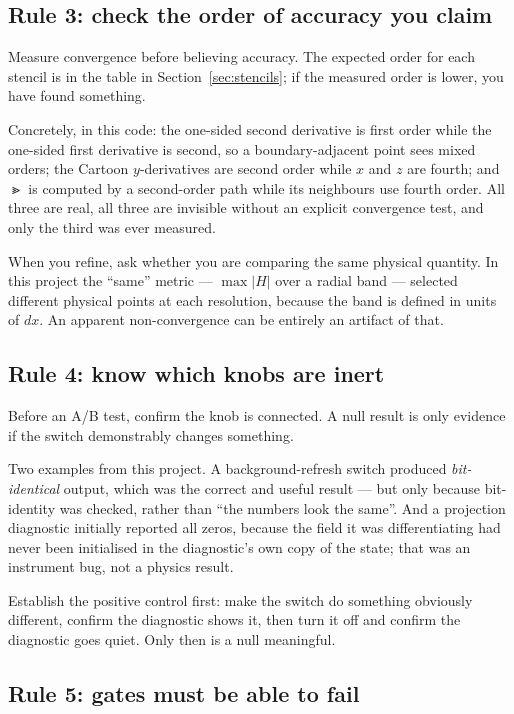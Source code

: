 \subsection{Rule 3: check the order of accuracy you claim}

Measure convergence before believing accuracy. The expected order for each
stencil is in the table in Section~\ref{sec:stencils}; if the measured order is
lower, you have found something.

Concretely, in this code: the one-sided second derivative is first order while
the one-sided first derivative is second, so a boundary-adjacent point sees
mixed orders; the Cartoon $y$-derivatives are second order while $x$ and $z$
are fourth; and $\Gt$ is computed by a second-order path while its
neighbours use fourth order. All three are real, all three are invisible
without an explicit convergence test, and only the third was ever measured.

\gotcha
When you refine, ask whether you are comparing the same physical quantity. In
this project the ``same'' metric --- $\max|H|$ over a radial band --- selected
different physical points at each resolution, because the band is defined in
units of $dx$. An apparent non-convergence can be entirely an artifact of that.

\subsection{Rule 4: know which knobs are inert}

Before an A/B test, confirm the knob is connected. A null result is only
evidence if the switch demonstrably changes something.

Two examples from this project. A background-refresh switch produced
\emph{bit-identical} output, which was the correct and useful result --- but
only because bit-identity was checked, rather than ``the numbers look the
same''. And a projection diagnostic initially reported all zeros, because the
field it was differentiating had never been initialised in the diagnostic's
own copy of the state; that was an instrument bug, not a physics result.

\gotcha
Establish the positive control first: make the switch do something obviously
different, confirm the diagnostic shows it, then turn it off and confirm the
diagnostic goes quiet. Only then is a null meaningful.

\subsection{Rule 5: gates must be able to fail}

